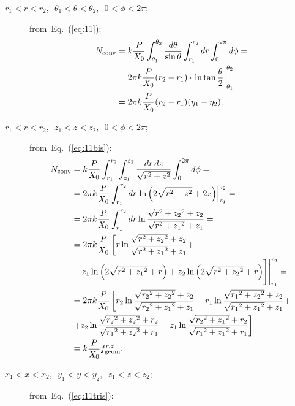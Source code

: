 \begin{description}
\item[$r_1<r<r_2$,~$\, \theta_1<\theta<\theta_2$,~$\, 0<\phi<2\pi$;]
  from~Eq.~(\ref{eq:11}): 
\begin{equation}
\begin{split}
N_{\rm conv} & = k \frac{P}{X_0} \int_{\theta_1}^{\theta_2}
\frac{d\theta}{\sin\theta} \int_{r_1}^{r_2}dr \int_0^{2\pi}d\phi = \\
& = 2\pi k \frac{P}{X_0} (r_2-r_1) \cdot \left. \ln \tan
    \frac{\theta}{2} \right|_{\theta_1}^{\theta_2} =\\
& = 2\pi k \frac{P}{X_0} (r_2-r_1) (\eta_1 - \eta_2).
\end{split}
\label{eq:12}
\end{equation}
\item[$r_1<r<r_2$,~$\, z_1<z<z_2$,~$\, 0<\phi<2\pi$;]
  from~Eq.~(\ref{eq:11bis}): 
\begin{equation}
\begin{split}
N_{\rm conv} & = k
\frac{P}{X_0} \int_{r_1}^{r_2} \int_{z_1}^{z_2} \frac{dr \, dz}{\sqrt{r^2+z^2}}
\int_0^{2\pi} d\phi = \\
& = 2\pi k \frac{P}{X_0} \int_{r_1}^{r_2} dr \left. \ln \left( 2\sqrt{r^2+z^2}+2z \right) \right|_{z_1}^{z_2} = \\
& = 2\pi k \frac{P}{X_0} \int_{r_1}^{r_2} dr \ln \frac{\sqrt{r^2+{z_2}^2}+z_2}{\sqrt{r^2+{z_1}^2}+{z_1}} = \\ 
& = 2\pi k \frac{P}{X_0} \left[ r \ln \frac{\sqrt{r^2+{z_2}^2}+z_2}{\sqrt{r^2+{z_1}^2}+{z_1}} + \right. \\
& - z_1 \ln \left( 2\sqrt{r^2+{z_1}^2}+r \right)  + \Biggl. \Biggl. z_2 \ln \left( 2\sqrt{r^2+{z_2}^2}+r \right) \Biggr] \Biggr|_{r_1}^{r_2} = \\
& = 2\pi k \frac{P}{X_0} \left[ r_2 \ln \frac{\sqrt{{r_2}^2+{z_2}^2}+z_2}{\sqrt{{r_2}^2+{z_1}^2}+z_1} - r_1 \ln \frac{\sqrt{{r_1}^2+{z_2}^2}+z_2}{\sqrt{{r_1}^2+{z_1}^2}+z_1} + \right. \\
& \left. + z_2 \ln \frac{\sqrt{{r_2}^2+{z_2}^2}+r_2}{\sqrt{{r_1}^2+{z_2}^2}+r_1} - z_1 \ln \frac{\sqrt{{r_2}^2+{z_1}^2}+r_2}{\sqrt{{r_1}^2+{z_1}^2}+r_1} \right] \\
& \equiv k \frac{P}{X_0} f^{r, z}_{\rm geom}.\\
\end{split}
\label{eq:13}
\end{equation}
\item[$x_1<x<x_2$,~$\, y_1<y<y_2$,~$\, z_1<z<z_2$;]
  from~Eq.~(\ref{eq:11tris}): 

\end{description}
